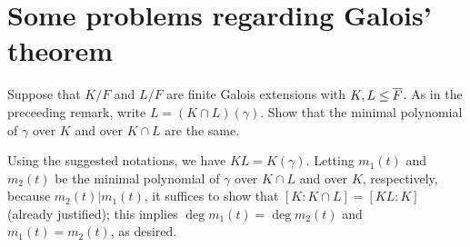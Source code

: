 \section{Some problems regarding Galois' theorem}

\begin{prob}\label{gapped_proof: Galois'_thm}
    Suppose that $K/F$ and $L/F$ are finite Galois extensions with $K, L\leq \overline{F}$.
    As in the preceeding remark, write $L=(K\cap L)(\gamma)$.
    Show that the minimal polynomial of $\gamma$ over $K$ and over $K\cap L$ are the same.
\end{prob}
\begin{sol}
    Using the suggested notations, we have $KL=K(\gamma)$.
    Letting $m_1(t)$ and $m_2(t)$ be the minimal polynomial of $\gamma$ over $K\cap L$ and over $K$, respectively, because $m_2(t)|m_1(t)$, it suffices to show that $[K:K\cap L]=[KL:K]$ (already justified); this implies $\deg m_1(t)=\deg m_2(t)$ and $m_1(t)=m_2(t)$, as desired.
\end{sol}


